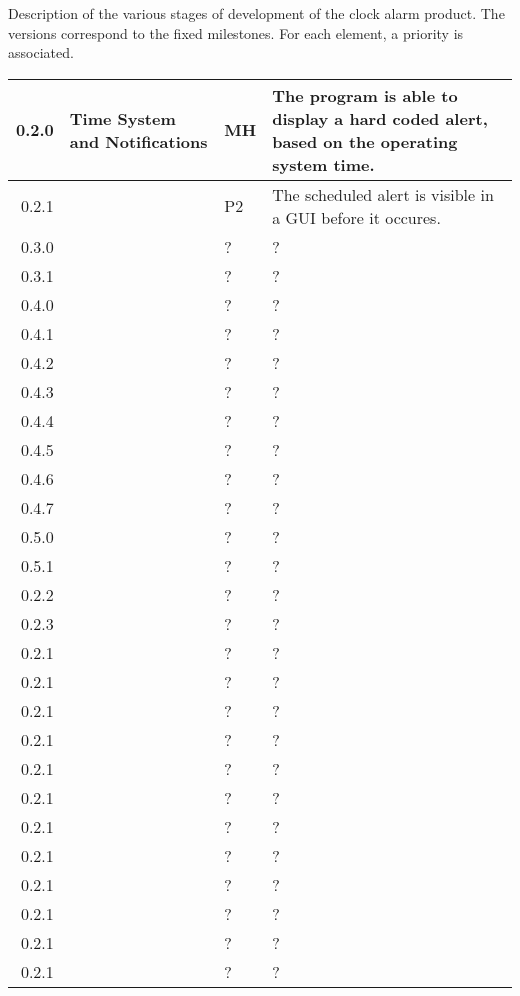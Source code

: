 Description of the various stages of development of the clock alarm product. The versions correspond to the fixed milestones. For each element, a priority is associated.

\begin{tabular}{| r | l | l | l |}
	\hline
	0.2.0 & Time System and Notifications & MH & The program is able to display a hard coded alert, based on the operating system time. \\ \hline
	0.2.1 & \fullref{subsec:usecase_launch} & P2 & The scheduled alert is visible in a GUI before it occures. \\ \hline
	0.3.0 & \fullref{subsec:???} & ? & ? \\ \hline
	0.3.1 & \fullref{subsec:???} & ? & ? \\ \hline
	0.4.0 & \fullref{subsec:???} & ? & ? \\ \hline
	0.4.1 & \fullref{subsec:???} & ? & ? \\ \hline
	0.4.2 & \fullref{subsec:???} & ? & ? \\ \hline
	0.4.3 & \fullref{subsec:???} & ? & ? \\ \hline
	0.4.4 & \fullref{subsec:???} & ? & ? \\ \hline
	0.4.5 & \fullref{subsec:???} & ? & ? \\ \hline
	0.4.6 & \fullref{subsec:???} & ? & ? \\ \hline
	0.4.7 & \fullref{subsec:???} & ? & ? \\ \hline
	0.5.0 & \fullref{subsec:???} & ? & ? \\ \hline
	0.5.1 & \fullref{subsec:???} & ? & ? \\ \hline
	0.2.2 & \fullref{subsec:???} & ? & ? \\ \hline
	0.2.3 & \fullref{subsec:???} & ? & ? \\ \hline
	0.2.1 & \fullref{subsec:???} & ? & ? \\ \hline
	0.2.1 & \fullref{subsec:???} & ? & ? \\ \hline
	0.2.1 & \fullref{subsec:???} & ? & ? \\ \hline
	0.2.1 & \fullref{subsec:???} & ? & ? \\ \hline
	0.2.1 & \fullref{subsec:???} & ? & ? \\ \hline
	0.2.1 & \fullref{subsec:???} & ? & ? \\ \hline
	0.2.1 & \fullref{subsec:???} & ? & ? \\ \hline
	0.2.1 & \fullref{subsec:???} & ? & ? \\ \hline
	0.2.1 & \fullref{subsec:???} & ? & ? \\ \hline
	0.2.1 & \fullref{subsec:???} & ? & ? \\ \hline
	0.2.1 & \fullref{subsec:???} & ? & ? \\ \hline
	0.2.1 & \fullref{subsec:???} & ? & ? \\ \hline
	\hline
\end{tabular}